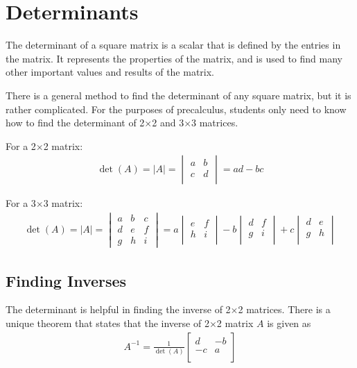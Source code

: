 \documentclass[11pt]{article}
\begin{document}
\section{Determinants}

The determinant of a square matrix is a scalar that is defined by the entries in the matrix. It represents the properties of the matrix, and is used to find many other important values and results of the matrix. 

There is a general method to find the determinant of any square matrix, but it is rather complicated. For the purposes of precalculus, students only need to know how to find the determinant of 2$\times$2 and 3$\times$3 matrices.

For a 2$\times$2 matrix:
\begin{align*}
    \det (A) = |A| =
    \begin{vmatrix}
        a & b \\
        c & d \\
    \end{vmatrix}
    = ad - bc
\end{align*}

For a 3$\times$3 matrix:
\begin{align*}
    \det (A) = |A| =
    \begin{vmatrix}
        a & b & c \\
        d & e & f \\
        g & h & i
    \end{vmatrix}
    = a\begin{vmatrix}
        e & f \\
        h & i \\
    \end{vmatrix}
    -b\begin{vmatrix}
        d & f \\
        g & i \\
    \end{vmatrix}
    +c\begin{vmatrix}
        d & e \\
        g & h \\
    \end{vmatrix}
\end{align*}

\subsection{Finding Inverses}

The determinant is helpful in finding the inverse of 2$\times$2 matrices. There is a unique theorem that states that the inverse of 2$\times$2 matrix $A$ is given as
\begin{align*}
    A^{-1} = \frac{1}{\det (A)}
    \begin{bmatrix}
        d & -b \\
        -c & a \\
    \end{bmatrix}
\end{align*}
\end{document}
